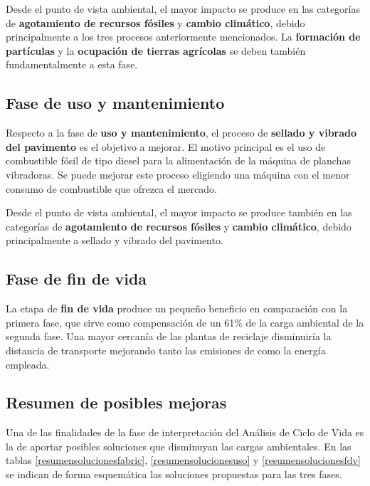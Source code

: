 Desde el punto de vista ambiental, el mayor impacto se produce en las categorías de \textbf{agotamiento de recursos fósiles} y \textbf{cambio climático}, debido principalmente a los tres procesos anteriormente mencionados. La \textbf{formación de partículas} y la \textbf{ocupación de tierras agrícolas} se deben también fundamentalmente a esta fase.

\subsection{Fase de uso y mantenimiento}
Respecto a la fase de \textbf{uso y mantenimiento}, el proceso de \textbf{sellado y vibrado del pavimento} es el objetivo a mejorar. El motivo principal es el uso de combustible fósil de tipo diesel para la alimentación de la máquina de planchas vibradoras. Se puede mejorar este proceso eligiendo una máquina con el menor consumo de combustible que ofrezca el mercado.

Desde el punto de vista ambiental, el mayor impacto se produce también en las categorías de \textbf{agotamiento de recursos fósiles} y \textbf{cambio climático}, debido principalmente a sellado y vibrado del pavimento.

\subsection{Fase de fin de vida}
La etapa de \textbf{fin de vida} produce un pequeño beneficio en comparación con la primera fase, que sirve como compensación de un 61\% de la carga ambiental de la segunda fase. Una mayor cercanía de las plantas de reciclaje disminuiría la distancia de transporte mejorando tanto las emisiones de  como la energía empleada.

\subsection{Resumen de posibles mejoras}
Una de las finalidades de la fase de interpretación del Análisis de Ciclo de Vida es la de aportar posibles soluciones que disminuyan las cargas ambientales. En las tablas \ref{resumensolucionesfabric}, \ref{resumensolucionesuso} y \ref{resumensolucionesfdv} se indican de forma esquemática las soluciones propuestas para las tres fases.

